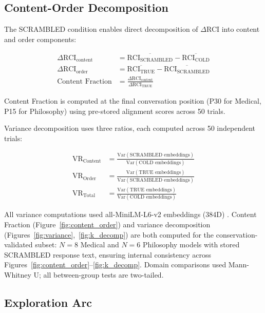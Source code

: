 \documentclass[11pt,a4paper]{article}
\begin{document}
\subsection{Content-Order Decomposition}

The SCRAMBLED condition enables direct decomposition of $\Delta$RCI into content and order components:

\begin{align}
\Delta\text{RCI}_\text{content} &= \overline{\text{RCI}_\text{SCRAMBLED}} - \overline{\text{RCI}_\text{COLD}} \\
\Delta\text{RCI}_\text{order} &= \overline{\text{RCI}_\text{TRUE}} - \overline{\text{RCI}_\text{SCRAMBLED}} \\
\text{Content Fraction} &= \frac{\Delta\text{RCI}_\text{content}}{\Delta\text{RCI}_\text{TRUE}}
\end{align}

\noindent Content Fraction is computed at the final conversation position (P30 for Medical, P15 for Philosophy) using pre-stored alignment scores across 50 trials.

\noindent Variance decomposition uses three ratios, each computed across 50 independent trials:

\begin{align}
\text{VR}_\text{Content} &= \frac{\text{Var}(\text{SCRAMBLED embeddings})}{\text{Var}(\text{COLD embeddings})} \\
\text{VR}_\text{Order} &= \frac{\text{Var}(\text{TRUE embeddings})}{\text{Var}(\text{SCRAMBLED embeddings})} \\
\text{VR}_\text{Total} &= \frac{\text{Var}(\text{TRUE embeddings})}{\text{Var}(\text{COLD embeddings})}
\end{align}

\noindent All variance computations used all-MiniLM-L6-v2 embeddings (384D) \citep{reimers2019sentence}. Content Fraction (Figure~\ref{fig:content_order}) and variance decomposition (Figures~\ref{fig:variance},~\ref{fig:k_decomp}) are both computed for the conservation-validated subset: $N = 8$ Medical and $N = 6$ Philosophy models with stored SCRAMBLED response text, ensuring internal consistency across Figures~\ref{fig:content_order}--\ref{fig:k_decomp}. Domain comparisons used Mann-Whitney U; all between-group tests are two-tailed.

\subsection{Exploration Arc}
\end{document}
